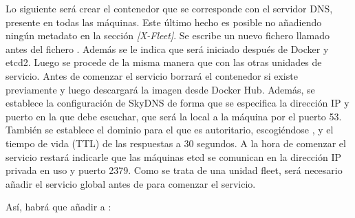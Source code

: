 Lo siguiente será crear el contenedor que se corresponde con el servidor DNS, presente en todas las máquinas. Este último hecho es posible no añadiendo ningún metadato en la sección \textit{[X-Fleet]}. Se escribe un nuevo fichero llamado  antes del fichero . Además se le indica que será iniciado después de Docker y etcd2. Luego se procede de la misma manera que con las otras unidades de servicio. Antes de comenzar el servicio borrará el contenedor si existe previamente y luego descargará la imagen desde Docker Hub. Además, se establece la configuración de SkyDNS de forma que se especifica la dirección IP y puerto en la que debe escuchar, que será la local a la máquina por el puerto 53. También se establece el dominio para el que es autoritario, escogiéndose , y el tiempo de vida (TTL) de las respuestas a 30 segundos. A la hora de comenzar el servicio restará indicarle que las máquinas etcd se comunican en la dirección IP privada en uso y puerto 2379. Como se trata de una unidad fleet, será necesario añadir el servicio global  antes de  para comenzar el servicio. 

Así, habrá que añadir a :

